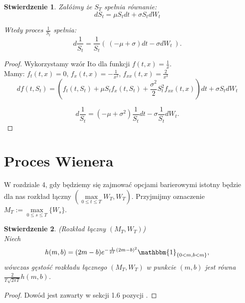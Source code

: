 \documentclass[11pt]{report}
\newtheorem{stw}{Stwierdzenie}[chapter]
\begin{document}
\begin{stw}
 Załóżmy że $S_T$ spełnia równanie: 
 \begin{equation*} 
dS_t = \mu S_tdt + \sigma S_t dW_t  
 \end{equation*}

 Wtedy proces $\frac{1}{S_t}$  spełnia: \\
\begin{equation*}
d\frac{1}{S_t} = \frac{1}{S_t}( \ (-\mu+\sigma)dt - \sigma  d W_t \ ).
\end{equation*} 
\end{stw}

\begin{proof}
Wykorzystamy wzór Ito dla funkcji $f(t,x) = \frac{1}{x}$. \\
Mamy: $f_t(t,x) = 0$, $f_x(t,x) = -\frac{1}{x^2}$, $f_{xx}(t,x)= \frac{2}{x^3}$
\begin{equation*}
df(t,S_t) = (f_t(t,S_t)+\mu S_t f_x(t,S_t)+\frac{\sigma^2}{2}S_t^2 f_{xx}(t,x))dt + \sigma S_t dW_t
\end{equation*}

\begin{equation*}
d\frac{1}{S_t} = (-\mu + \sigma^2)\frac{1}{S_t}dt - \sigma \frac{1}{S_t} dW_t.
\end{equation*}


\end{proof}
 
\section{Proces Wienera} 


W rozdziale 4, gdy będziemy się zajmować opcjami barierowymi istotny będzie dla nas rozkład łączny
$\left(\max\limits_{0 \le t \le T} W_T, W_T\right)$.
Przyjmijmy oznaczenie $ M_T := \max\limits_{0 \le s \le T} \{ W_s \}  $.  \\

\begin{stw} (Rozkład łączny $(M_T, W_T)$) \\
Niech
\begin{equation*}
h(m,b) = (2m-b)e^{-\frac{1}{2T}(2m-b)^2}\mathbbm{1}_{ \{ 0<m, b<m \} },
\end{equation*}
wówczas gęstość rozkładu łącznego $(M_T, W_T)$ w punkcie $(m,b)$ jest równa $\frac{2}{T\sqrt{2\pi T}}h(m,b)$.

\end{stw}
\begin{proof}
Dowód jest zawarty w sekcji 1.6 pozycji \cite{Bro}.
\end{proof}	
\end{document}
